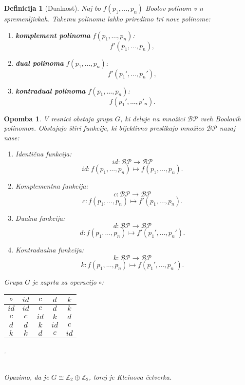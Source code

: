 \documentclass{amsart}
\newcommand{\ZZ}{\mathbb{Z}}
\newtheorem{definicija}[izrek]{Definicija}
\newtheorem{opomba}[izrek]{Opomba}
\begin{document}
\begin{definicija}[Dualnost]
    Naj bo \(f(p_1, \ldots ,p_n)\) Boolov polinom v n spremenljivkah. Takemu polinomu lahko priredimo
    tri nove polinome:
    \begin{enumerate}
        \item {\bf komplement polinoma} \(f(p_1, \ldots ,p_n)\):
            \[f'(p_1, \ldots ,p_n),\]
        \item {\bf dual polinoma} \(f(p_1, \ldots ,p_n)\):
            \[f'(p_1', \ldots ,p_n'),\]
        \item {\bf kontradual polinoma} \(f(p_1, \ldots ,p_n)\):
            \[f(p_1', \ldots ,p'_n).\]
    \end{enumerate}
\end{definicija}
\begin{opomba}
    V resnici obstaja grupa \(G\), ki deluje na množici \(\mathcal{BP}\) vseh Boolovih polinomov.
    Obstajajo štiri funkcije, ki bijektivno preslikajo množico \(\mathcal{BP}\) nazaj nase:
    \begin{enumerate}
        \item Identična funkcija:
        \[id: \mathcal{BP} \rightarrow \mathcal{BP}\]
        \[id: f(p_1, \ldots ,p_n) \mapsto f(p_1, \ldots ,p_n).\]
        \item Komplementna funkcija:
        \[c: \mathcal{BP} \rightarrow \mathcal{BP}\]
        \[c: f(p_1, \ldots ,p_n) \mapsto f'(p_1, \ldots ,p_n).\]
        \item Dualna funkcija:
        \[d: \mathcal{BP} \rightarrow \mathcal{BP}\]
        \[d: f(p_1, \ldots ,p_n) \mapsto f'(p_1', \ldots ,p_n').\]
        \item Kontradualna funkcija:
        \[k: \mathcal{BP} \rightarrow \mathcal{BP}\]
        \[k: f(p_1, \ldots ,p_n) \mapsto f(p_1', \ldots ,p_n').\]
    \end{enumerate}

    Grupa \(G\) je zaprta za operacijo \(\circ\):
    \begin{table*}[htp]
        \begin{tabular}{c|c|c|c|c|}
            \(\circ\) & $id$ & $c$ & $d$ & $k$ \\
            \hline
            $id$ & $id$ &$c$ & $d$ & $k$ \\
            \hline
            $c$ & $c$ & $id$ & $k$ & $d$ \\
            \hline
            $d$ & $d$ & $k$ & $id$ & $c$ \\
            \hline
            $k$ & $k$ & $d$ & $c$ & $id$ \\
            \hline
        \end{tabular}.
    \end{table*}\\
    Opazimo, da je \(G \cong \ZZ_2  \oplus \ZZ_2 \), torej je Kleinova četverka.
\end{opomba}
\end{document}
